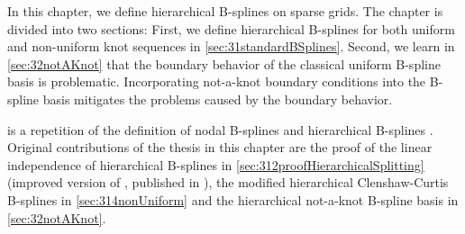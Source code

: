 In this chapter, we define hierarchical B-splines on sparse grids.
The chapter is divided into two sections:
First, we define hierarchical B-splines for both
uniform and non-uniform knot sequences in \cref{sec:31standardBSplines}.
Second, we learn in \cref{sec:32notAKnot} that the boundary behavior
of the classical uniform B-spline basis is problematic.
Incorporating not-a-knot boundary conditions into the B-spline basis
mitigates the problems caused by the boundary behavior.

 is a repetition of the definition
of nodal B-splines \cite{Hoellig03Finite,Hoellig13Approximation} and
hierarchical B-splines \cite{Pflueger10Spatially,Valentin14Hierarchische}.
Original contributions of the thesis in this chapter are the proof of
the linear independence of hierarchical B-splines in
\cref{sec:312proofHierarchicalSplitting}
(improved version of \cite{Valentin14Hierarchische},
published in \cite{Valentin16Hierarchical}),
the modified hierarchical Clenshaw-Curtis B-splines in
\cref{sec:314nonUniform} and
the hierarchical not-a-knot B-spline basis in \cref{sec:32notAKnot}.






\cleardoublepage
